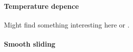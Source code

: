 






\paragraph*{Temperature depence}

Might find something interesting here \cite{zhao_thermally_2007} or \cite{PhysRevE.71.065101}.


\paragraph*{Smooth sliding}

